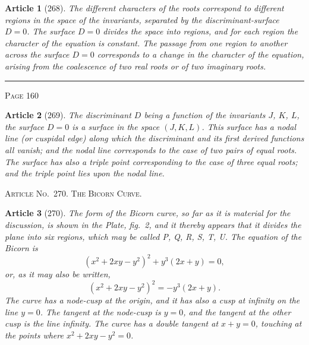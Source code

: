 \documentclass[11pt,a4paper]{article}
\theoremstyle{cayley}
\newtheorem{art}{Article}
\begin{document}
\begin{art}[268]
The different characters of the roots correspond to different regions in the space of the invariants, separated by the discriminant-surface $D=0$. The surface $D=0$ divides the space into regions, and for each region the character of the equation is constant. The passage from one region to another across the surface $D=0$ corresponds to a change in the character of the equation, arising from the coalescence of two real roots or of two imaginary roots.
\end{art}

\vspace{1em}
\noindent\rule{\textwidth}{0.4pt}
\begin{center}\textsc{Page 160}\end{center}
\newpage

\begin{art}[269]
The discriminant $D$ being a function of the invariants $J$, $K$, $L$, the surface $D=0$ is a surface in the space $(J, K, L)$. This surface has a nodal line (or cuspidal edge) along which the discriminant and its first derived functions all vanish; and the nodal line corresponds to the case of two pairs of equal roots. The surface has also a triple point corresponding to the case of three equal roots; and the triple point lies upon the nodal line.
\end{art}

\begin{center}
\textsc{Article No.\ 270. The Bicorn Curve.}
\end{center}

\begin{art}[270]
The form of the Bicorn curve, so far as it is material for the discussion, is shown in the Plate, fig.~2, and it thereby appears that it divides the plane into six regions, which may be called P, Q, R, S, T, U. The equation of the Bicorn is
\[
(x^2 + 2xy - y^2)^2 + y^3(2x + y) = 0,
\]
or, as it may also be written,
\[
(x^2 + 2xy - y^2)^2 = -y^3(2x + y).
\]
The curve has a node-cusp at the origin, and it has also a cusp at infinity on the line $y=0$. The tangent at the node-cusp is $y=0$, and the tangent at the other cusp is the line infinity. The curve has a double tangent at $x + y = 0$, touching at the points where $x^2 + 2xy - y^2 = 0$.
\end{art}
\end{document}

